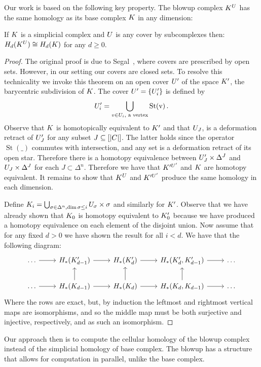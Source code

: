 Our work is based on the following key property.
The blowup complex $K^U$ has the same homology as its base complex $K$ in any 
dimension: 
\begin{theorem}
If $K$ is a simplicial complex and $U$ is any cover by subcomplexes then:
$H_d(K^U) \cong H_d(K)$ for any $d \geq 0$.
\end{theorem}
\begin{proof}
The original proof is due to Segal~\cite{segal}, where covers are prescribed by open sets. However, in our setting our covers are closed sets. To resolve this technicality we invoke this theorem on an open cover $U'$ of the space $K'$, the barycentric subdivision of $K$. The cover $U' = \{U'_i\}$ is defined by \[ U'_i = \bigcup_{v \in U_i, \textrm{ a vertex}} \operatorname{St(v)}. \] Observe that $K$ is homotopically equivalent to $K'$ and that $U_J$, is a deformation retract of $U'_J$ for any subset $J \subseteq [|C|]$.
The latter holds since the operator $\operatorname{St}(\_)$ commutes with intersection, and any set is a deformation retract of its open star. 
Therefore there is a homotopy equivalence between $U'_J \times \Delta^J$ and $U_J \times \Delta^J$ for each $J \subset \Delta^n$. Therefore we have that $K'^{U'}$ and $K$ are homotopy equivalent. It remains to show that $K^U$ and $K'^{U'}$ produce the same homology in each dimension. 

Define $K_i = \bigcup_{\sigma \in \Delta^n, \dim{\sigma} \leq i} U_\sigma \times \sigma$ and similarly for $K'$. Observe that  we have already shown that $K_0$ is homotopy equivalent to $K'_0$ because we have produced a homotopy equivalence on each element of the disjoint union. Now assume that for any fixed $d > 0$ we have shown the result for all $i < d$. We have that the following diagram:
\[ \begin{tikzcd}
\ldots \arrow{r} & H_*(\K'_{d-1}) \arrow{r} & H_*(\K'_d) \arrow{r} & H_*(\K'_d, \K'_{d-1}) \arrow{r} & \ldots \\
\ldots \arrow{r} & H_*(\K_{d-1}) \arrow{r}\arrow{u} & H_*(\K_d) \arrow{r}\arrow{u} & H_*(\K_d, \K_{d-1})\arrow{u}  \arrow{r} & \ldots
\end{tikzcd} \]
Where the rows are exact, but, by induction the leftmost and rightmost vertical maps are isomorphisms, and so the middle map must be both surjective and injective, respectively, and as such an isomorphism.
\end{proof}
Our approach then is to compute the cellular homology of the blowup complex 
instead of the simplicial homology of base complex. The blowup has a structure that allows 
for computation in parallel, unlike the base complex. 

